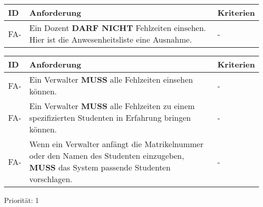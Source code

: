 \begin{tabular} {|p{}|p{11cm}|p{}|}
	\hline
	ID & Anforderung & Kriterien \\
	\hline
	FA-
	& Ein Dozent \textbf{DARF NICHT} Fehlzeiten einsehen. Hier ist die Anwesenheitsliste eine Ausnahme. 
	& - \\
	\hline
\end{tabular}

\begin{tabular} {|p{}|p{11cm}|p{}|}
	\hline
	ID & Anforderung & Kriterien \\
	\hline
	FA-
	& Ein Verwalter \textbf{MUSS} alle Fehlzeiten einsehen können. 
	& - \\
	\hline
	FA-
	& Ein Verwalter \textbf{MUSS} alle Fehlzeiten zu einem spezifizierten Studenten in Erfahrung bringen können.
	& - \\ 
	\hline
	FA-
	& Wenn ein Verwalter anfängt die Matrikelnummer oder den Namen des Studenten einzugeben, \textbf{MUSS} das System passende Studenten vorschlagen.
	& - \\ 
	\hline
\end{tabular}
Priorität: 1

